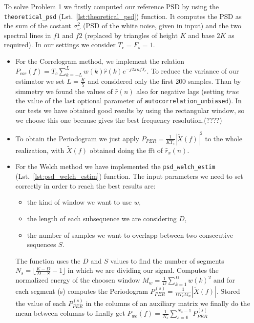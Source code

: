 \documentclass{article}
\newcommand{\inlinecode}[1]{\lstinline[basicstyle=\ttfamily,
    keywordstyle={}]{#1}}
\begin{document}
To solve Problem 1 we firstly computed our reference PSD by using the \inlinecode{theoretical_psd} (Lst.~\ref{lst:theoretical_psd}) function. It computes the PSD as the sum of the costant $\sigma_\omega^2$ (PSD of the white noise, given in input) and the two spectral lines in $f1$ and $f2$ (replaced by triangles of height $K$ and base $2K$ as required). In our settings we consider $T_c = F_s = 1$.
\begin{itemize}
 \item[a)] For the Correlogram method, we implement the relation \newline $P_{cor}(f) = T_c \sum_{k=-L}^{L} w(k)\hat{r}(k)e^{-j 2 \pi n f T_c}$. To reduce the variance of our estimator we set $L=\frac{K}{5}$ and considered only the first 200 samples. Than by simmetry we found the values of $\hat{r}(n)$ also for negative lags (setting $true$ the value of the last optional parameter of \inlinecode{autocorrelation_unbiased}). In our tests we have obtained good results by using the rectangular window, so we choose this one because gives the best frequency resolution.(????)
 \item[b)] To obtain the Periodogram we just apply $P_{PER} = \frac{1}{K T_c} |\tilde{X}(f)|^2$ to the whole realization, with $\tilde{X}(f)$ obtained doing the fft of $\hat{r}_x(n)$.
 \item[c)] For the Welch method we have implemented the \inlinecode{psd_welch_estim} (Lst.~\ref{lst:psd_welch_estim}) function. The input parameters we need to set correctly in order to reach the best results are:
 \begin{itemize}
 \item the kind of window we want to use $w$,
 \item the length of each subsequence we are considering $D$, 
 \item the number of samples we want to overlapp between two consecutive sequences $S$. 
\end{itemize} 
The function uses the $D$ and $S$ values to find the number of segments $N_s = \bigl\lfloor \frac{K-D}{D-S} -1\bigl\rfloor $ in which we are dividing our signal. Computes the normalized energy of the choosen window $M_w = \frac{1}{D} \sum_{k=1}^{D} {w(k)^2} $ and for each segment (s) computes the Periodogram $P_{PER}^{(s)} = \frac{1}{D T_c M_w} |\tilde{X}(f)|$. Stored the value of each $P_{PER}^{(s)}$ in the columns of an auxiliary matrix we finally do the mean between columns to finally get $P_{we}(f) = \frac{1}{N_s} \sum_{s=0}^{N_s-1} P_{PER}^{(s)} $

\end{itemize}
\end{document}
